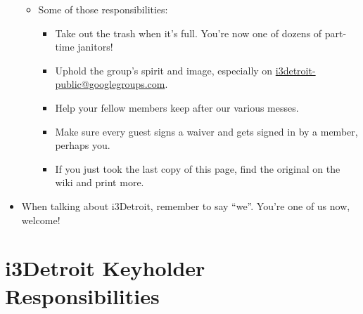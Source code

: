 \documentclass[10pt,letterpaper]{article}
\begin{document}
\begin{itemize}
\begin{itemize}
\begin{itemize}
                \end{itemize}
                \item Some of those responsibilities:
                \begin{itemize}
                    \item Take out the trash when it's full. You're now one of dozens of part-time janitors!
                    \item Uphold the group's spirit and image, especially on \href{mailto:i3detroit-public@googlegroups.com}{i3detroit-public@googlegroups.com}.
                    \item Help your fellow members keep after our various messes.
                    \item Make sure every guest signs a waiver and gets signed in by a member, perhaps you.
                    \item If you just took the last copy of this page, find the original on the wiki and print more.
                \end{itemize}
            \end{itemize}
        \item When talking about i3Detroit, remember to say ``we''. You're one of us now, welcome!
    \end{itemize}

\newpage

    \section*{\centering i3Detroit Keyholder Responsibilities}
\end{document}
